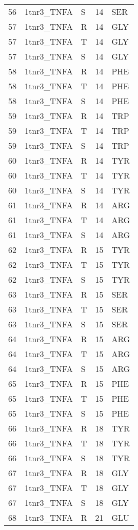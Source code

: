 \begin{longtable}[l]{l|l|l|l|l}
	56 & 1tnr3_TNFA & S & 14 & SER \\
	57 & 1tnr3_TNFA & R & 14 & GLY \\
	57 & 1tnr3_TNFA & T & 14 & GLY \\
	57 & 1tnr3_TNFA & S & 14 & GLY \\
	58 & 1tnr3_TNFA & R & 14 & PHE \\
	58 & 1tnr3_TNFA & T & 14 & PHE \\
	58 & 1tnr3_TNFA & S & 14 & PHE \\
	59 & 1tnr3_TNFA & R & 14 & TRP \\
	59 & 1tnr3_TNFA & T & 14 & TRP \\
	59 & 1tnr3_TNFA & S & 14 & TRP \\
	60 & 1tnr3_TNFA & R & 14 & TYR \\
	60 & 1tnr3_TNFA & T & 14 & TYR \\
	60 & 1tnr3_TNFA & S & 14 & TYR \\
	61 & 1tnr3_TNFA & R & 14 & ARG \\
	61 & 1tnr3_TNFA & T & 14 & ARG \\
	61 & 1tnr3_TNFA & S & 14 & ARG \\
	62 & 1tnr3_TNFA & R & 15 & TYR \\
	62 & 1tnr3_TNFA & T & 15 & TYR \\
	62 & 1tnr3_TNFA & S & 15 & TYR \\
	63 & 1tnr3_TNFA & R & 15 & SER \\
	63 & 1tnr3_TNFA & T & 15 & SER \\
	63 & 1tnr3_TNFA & S & 15 & SER \\
	64 & 1tnr3_TNFA & R & 15 & ARG \\
	64 & 1tnr3_TNFA & T & 15 & ARG \\
	64 & 1tnr3_TNFA & S & 15 & ARG \\
	65 & 1tnr3_TNFA & R & 15 & PHE \\
	65 & 1tnr3_TNFA & T & 15 & PHE \\
	65 & 1tnr3_TNFA & S & 15 & PHE \\
	66 & 1tnr3_TNFA & R & 18 & TYR \\
	66 & 1tnr3_TNFA & T & 18 & TYR \\
	66 & 1tnr3_TNFA & S & 18 & TYR \\
	67 & 1tnr3_TNFA & R & 18 & GLY \\
	67 & 1tnr3_TNFA & T & 18 & GLY \\
	67 & 1tnr3_TNFA & S & 18 & GLY \\
	68 & 1tnr3_TNFA & R & 21 & GLU \\

\end{longtable}
